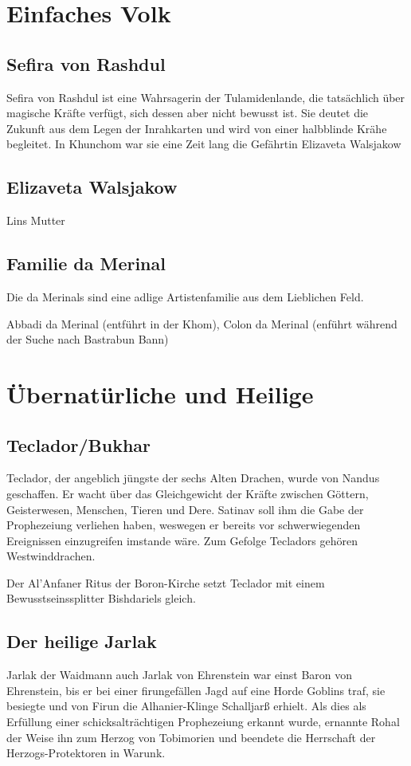 \section{Einfaches Volk}
\subsection{Sefira von Rashdul}
Sefira von Rashdul ist eine Wahrsagerin der Tulamidenlande, die tatsächlich über magische Kräfte verfügt, sich dessen aber nicht bewusst ist. Sie deutet die Zukunft aus dem Legen der Inrahkarten und wird von einer halbblinde Krähe begleitet. In Khunchom war sie eine Zeit lang die Gefährtin Elizaveta Walsjakow

\subsection{Elizaveta Walsjakow}
Lins Mutter

\subsection{Familie da Merinal}
Die da Merinals sind eine adlige Artistenfamilie aus dem Lieblichen Feld.

Abbadi da Merinal (entführt in der Khom), Colon da Merinal (enführt während der Suche nach Bastrabun Bann)

\section{Übernatürliche und Heilige}
\subsection{Teclador/Bukhar}
Teclador, der angeblich jüngste der sechs Alten Drachen, wurde von Nandus geschaffen. Er wacht über das Gleichgewicht der Kräfte zwischen Göttern, Geisterwesen, Menschen, Tieren und Dere. Satinav soll ihm die Gabe der Prophezeiung verliehen haben, weswegen er bereits vor schwerwiegenden Ereignissen einzugreifen imstande wäre. Zum Gefolge Tecladors gehören Westwinddrachen.

Der Al'Anfaner Ritus der Boron-Kirche setzt Teclador mit einem Bewusstseinssplitter Bishdariels gleich. 

\subsection{Der heilige Jarlak}
Jarlak der Waidmann auch Jarlak von Ehrenstein war einst Baron von Ehrenstein, bis er bei einer firungefällen Jagd auf eine Horde Goblins traf, sie besiegte und von Firun die Alhanier-Klinge Schalljarß erhielt. Als dies als Erfüllung einer schicksalträchtigen Prophezeiung erkannt wurde, ernannte Rohal der Weise ihn zum Herzog von Tobimorien und beendete die Herrschaft der Herzogs-Protektoren in Warunk.

